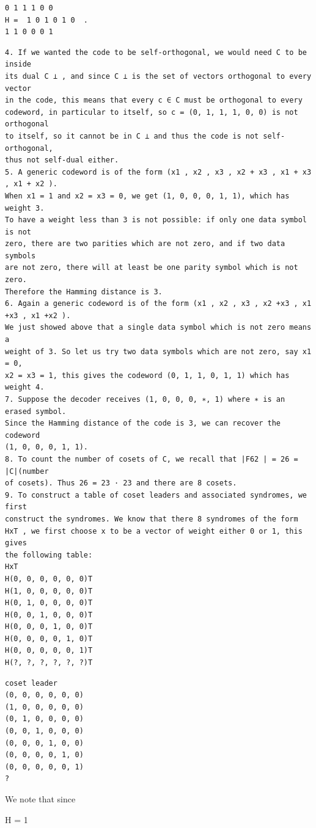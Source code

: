 \documentclass[11pt]{article}
\begin{document}
\begin{solutionbox}
\begin{Verbatim}[fontsize=\small]
0 1 1 1 0 0
H =  1 0 1 0 1 0  .
1 1 0 0 0 1
\end{Verbatim}
\begin{Verbatim}[fontsize=\small]
4. If we wanted the code to be self-orthogonal, we would need C to be inside
its dual C ⊥ , and since C ⊥ is the set of vectors orthogonal to every vector
in the code, this means that every c ∈ C must be orthogonal to every
codeword, in particular to itself, so c = (0, 1, 1, 1, 0, 0) is not orthogonal
to itself, so it cannot be in C ⊥ and thus the code is not self-orthogonal,
thus not self-dual either.
5. A generic codeword is of the form (x1 , x2 , x3 , x2 + x3 , x1 + x3 , x1 + x2 ).
When x1 = 1 and x2 = x3 = 0, we get (1, 0, 0, 0, 1, 1), which has weight 3.
To have a weight less than 3 is not possible: if only one data symbol is not
zero, there are two parities which are not zero, and if two data symbols
are not zero, there will at least be one parity symbol which is not zero.
Therefore the Hamming distance is 3.
6. Again a generic codeword is of the form (x1 , x2 , x3 , x2 +x3 , x1 +x3 , x1 +x2 ).
We just showed above that a single data symbol which is not zero means a
weight of 3. So let us try two data symbols which are not zero, say x1 = 0,
x2 = x3 = 1, this gives the codeword (0, 1, 1, 0, 1, 1) which has weight 4.
7. Suppose the decoder receives (1, 0, 0, 0, ∗, 1) where ∗ is an erased symbol.
Since the Hamming distance of the code is 3, we can recover the codeword
(1, 0, 0, 0, 1, 1).
8. To count the number of cosets of C, we recall that |F62 | = 26 = |C|(number
of cosets). Thus 26 = 23 · 23 and there are 8 cosets.
9. To construct a table of coset leaders and associated syndromes, we first
construct the syndromes. We know that there 8 syndromes of the form
HxT , we first choose x to be a vector of weight either 0 or 1, this gives
the following table:
HxT
H(0, 0, 0, 0, 0, 0)T
H(1, 0, 0, 0, 0, 0)T
H(0, 1, 0, 0, 0, 0)T
H(0, 0, 1, 0, 0, 0)T
H(0, 0, 0, 1, 0, 0)T
H(0, 0, 0, 0, 1, 0)T
H(0, 0, 0, 0, 0, 1)T
H(?, ?, ?, ?, ?, ?)T
\end{Verbatim}
\begin{Verbatim}[fontsize=\small]
coset leader
(0, 0, 0, 0, 0, 0)
(1, 0, 0, 0, 0, 0)
(0, 1, 0, 0, 0, 0)
(0, 0, 1, 0, 0, 0)
(0, 0, 0, 1, 0, 0)
(0, 0, 0, 0, 1, 0)
(0, 0, 0, 0, 0, 1)
?
\end{Verbatim}
We note that since

H =  1


\end{solutionbox}
\end{document}
